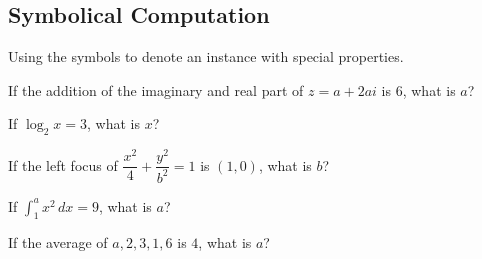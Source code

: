 \subsection{Symbolical Computation}
Using the symbols to denote an instance with special properties.

\begin{example}
  If the addition of the imaginary and real part of $z = a + 2ai$ is 6, what is $a$?
\end{example}

\begin{example}
  If $\log_2{x} = 3$, what is $x$?
\end{example}

\begin{example}
  If the left focus of $\dfrac{x^2}{4} + \dfrac{y^2}{b^2} = 1$ is $(1, 0)$, what is $b$?
\end{example}

\begin{example}
  If $\displaystyle \int_1^a x^2 \, dx = 9 $, what is $a$?
\end{example}

\begin{example}
  If the average of $a, 2, 3, 1, 6$ is $4$, what is $a$?
\end{example}
